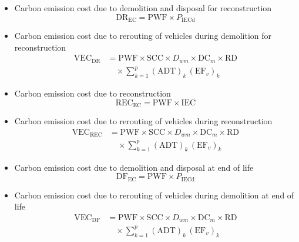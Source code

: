\documentclass[12pt,a4paper]{article}
\begin{document}
\begin{itemize}
  \item Carbon emission cost due to demolition and disposal for reconstruction
    \[ \mathrm{DR}_{\mathrm{EC}} = \mathrm{PWF} \times P_{\mathrm{IECd}} \]

  \item Carbon emission cost due to rerouting of vehicles during demolition for reconstruction
    \[\begin{array}{rl}
    \mathrm{VEC}_{\mathrm{DR}}
    &= \mathrm{PWF} \times \mathrm{SCC} \times D_{wm} \times \mathrm{DC}_m \times \mathrm{RD} \\
    &\quad \times \sum_{k=1}^{p} (\mathrm{ADT})_k\, (\mathrm{EF}_v)_k
    \end{array}\]

  \item Carbon emission cost due to reconstruction
    \[ \mathrm{REC}_{\mathrm{EC}} = \mathrm{PWF} \times \mathrm{IEC} \]

  \item Carbon emission cost due to rerouting of vehicles during reconstruction
    \[\begin{array}{rl}
    \mathrm{VEC}_{\mathrm{REC}}
    &= \mathrm{PWF} \times \mathrm{SCC} \times D_{wm} \times \mathrm{DC}_m \times \mathrm{RD} \\
    &\quad \times \sum_{k=1}^{p} (\mathrm{ADT})_k\, (\mathrm{EF}_v)_k
    \end{array}\]

  \item Carbon emission cost due to demolition and disposal at end of life
    \[ \mathrm{DF}_{\mathrm{EC}} = \mathrm{PWF} \times P_{\mathrm{IECd}} \]

  \item Carbon emission cost due to rerouting of vehicles during demolition at end of life
    \[\begin{array}{rl}
    \mathrm{VEC}_{\mathrm{DF}}
    &= \mathrm{PWF} \times \mathrm{SCC} \times D_{wm} \times \mathrm{DC}_m \times \mathrm{RD} \\
    &\quad \times \sum_{k=1}^{p} (\mathrm{ADT})_k\, (\mathrm{EF}_v)_k
    \end{array}\]
\end{itemize}



    

\clearpage
\end{document}
